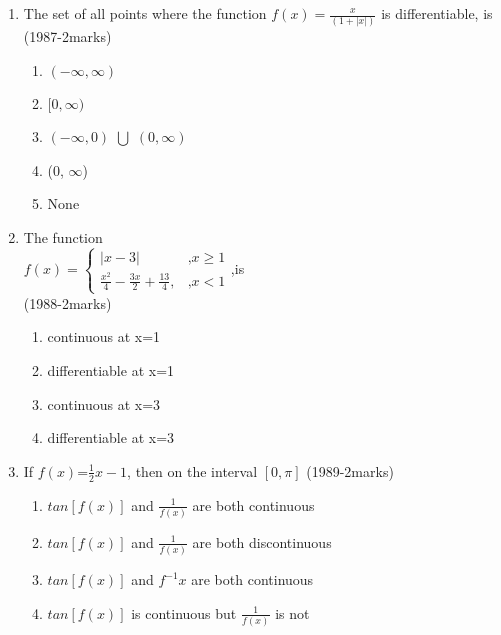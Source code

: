 \documentclass[journal,12pt,twocolumn]{IEEEtran}
\theoremstyle{remark}
\begin{document}
\begin{enumerate}
\item The set of all points where the function $f(x)=\frac{x}{(1+|x|)}$ is differentiable, is \\
\hfill{(1987-2marks)} 

\begin{enumerate}
    \item \((- \infty, \infty)\)
    \item \([0, \infty)\)
    \item \((- \infty,0)\) $\bigcup$ \((0, \infty)\)
    \item (0, $\infty$)
    \item None \\
\end{enumerate}
\item The function \\ $f(x)=\begin{cases}|x-3| & \text{,} x \geq 1 \\
    \frac{x^2}{4}-\frac{3x}{2}+\frac{13}{4}, & \text{,} x<1 
\end{cases}$,is \\ \hfill{(1988-2marks)} 
\begin{enumerate}
    \item continuous at x=1
    \item differentiable at x=1
    \item continuous at x=3
    \item differentiable at x=3 \\ 
\end{enumerate}
\item If $f(x)$=$\frac{1}{2}x-1$, then on the interval $[0,\pi]$ \hfill{(1989-2marks)} 
\begin{enumerate}
    \item $tan[f(x)]$ and $\frac{1}{f(x)}$ are both continuous
    \item $tan[f(x)]$ and $\frac{1}{f(x)}$ are both discontinuous
    \item $tan[f(x)]$ and $f^{-1}x$ are both continuous
    \item $tan[f(x)]$ is continuous but $\frac{1}{f(x)}$ is not \\
\end{enumerate}


\end{enumerate}
\end{document}
